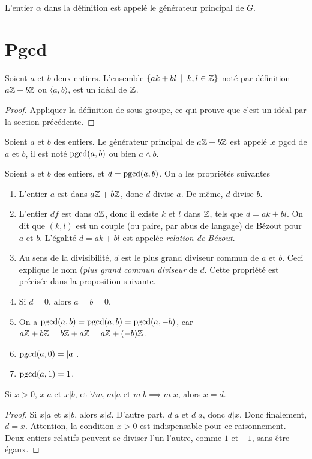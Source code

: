 L'entier $\alpha$ dans la définition est appelé le générateur principal de $G$.


\section{Pgcd}

\begin{proposition}
Soient $a$ et $b$ deux entiers. L'ensemble $\{ak+bl\:\mid\: k, l\in \mathbb{Z}\}$ noté par définition $a\mathbb{Z}+b\mathbb{Z}$ ou $\langle a,b\rangle$, est un idéal de $\mathbb{Z}$. 
\end{proposition}
\begin{proof}
Appliquer la définition de sous-groupe, ce qui prouve que c'est un idéal par la section précédente.
\end{proof}

\begin{definition}
Soient $a$ et $b$ des entiers. Le générateur principal de $a\mathbb{Z}+b\mathbb{Z}$ est appelé le pgcd de $a$ et $b$, il est noté $\operatorname{pgcd}(a,b)$ ou bien $a\wedge b$.
\end{definition}

\begin{proposition}
Soient $a$ et $b$ des entiers, et $d=\operatorname{pgcd}(a,b)$.
On a les propriétés suivantes
\begin{enumerate}
\item L'entier $a$ est dans $a\mathbb{Z}+b\mathbb{Z}$, donc $d$ divise $a$. De même, $d$ divise $b$.
\item L'entier $df$ est dans $d\mathbb{Z}$, donc il existe $k$ et $l$ dans $\mathbb{Z}$, tels que $d = ak+bl$. On dit que $(k,l)$ est un couple (ou paire, par abus de langage) de Bézout pour $a$ et $b$. L'égalité $d=ak+bl$ est appelée \emph{relation de Bézout}.
\item Au sens de la divisibilité, $d$ est le plus grand diviseur commun  de $a$ et $b$. Ceci explique le nom (\emph{plus grand commun diviseur} de $d$. Cette propriété est précisée dans la proposition suivante.
\item Si $d=0$, alors $a=b=0$.
\item On a $\operatorname{pgcd}(a,b)=\operatorname{pgcd}(a,b) = \operatorname{pgcd}(a,-b)$, car $a\mathbb{Z}+b\mathbb{Z} = b\mathbb{Z}+a\mathbb{Z}=a\mathbb{Z}+(-b)\mathbb{Z}$.
\item $\operatorname{pgcd}(a,0)=|a|$.
\item $\operatorname{pgcd}(a,1)=1$.
\end{enumerate}
\end{proposition}

\begin{proposition}
Si $x>0$, $x|a$ et $x|b$, et $\forall m, m|a \text{ et } m|b \implies m|x$, alors $x=d$.
\end{proposition}
\begin{proof}
Si $x|a$ et $x|b$, alors $x|d$. D'autre part, $d|a$ et $d|a$, donc $d|x$. Donc finalement, $d=x$.
Attention, la condition $x>0$ est indispensable pour ce raisonnement. Deux entiers relatifs peuvent se diviser l'un l'autre, comme $1$ et $-1$, sans être égaux.
\end{proof}

